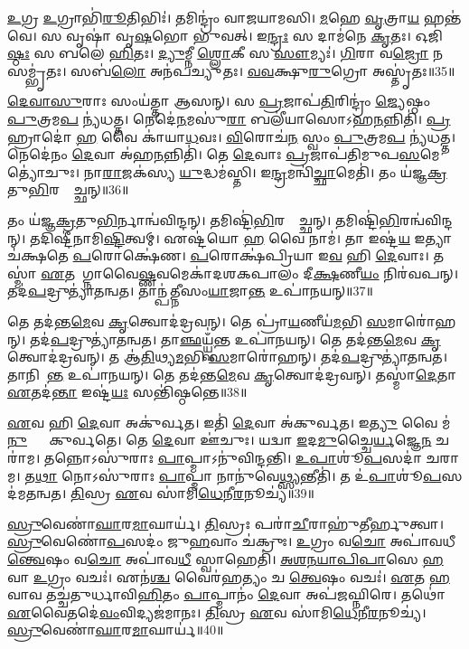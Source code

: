 \ul{𑌉}𑌗𑍍𑌰 \ul{𑌉}𑌗𑍍𑌰𑌾𑌭𑌿॑\ul{𑌰𑍂}𑌤𑌿𑌭𑌿𑌃॑।
𑌤𑌮𑌿𑌨𑍍𑌦𑍍𑌰𑌂॑ 𑌵𑌾𑌜𑌯𑌾𑌮𑌸𑌿।
\ul{𑌮}𑌹𑍇 \ul{𑌵𑍃}𑌤𑍍𑌰𑌾\ul{𑌯} 𑌹𑌨𑍍𑌤॑𑌵𑍇।
𑌸 𑌵𑍃𑌷𑌾॑ 𑌵𑍃\ul{𑌷}𑌭𑍋 𑌭𑍁॑𑌵𑌤𑍍।
𑌇\ul{𑌨𑍍𑌦𑍍𑌰𑌃} 𑌸 𑌦𑌾𑌮॑𑌨𑍇 \ul{𑌕𑍃}𑌤𑌃।
𑌓𑌜𑌿॑\ul{𑌷𑍍𑌠𑌃} 𑌸 𑌬𑌲𑍇॑ \ul{𑌹𑌿}𑌤𑌃।
\ul{𑌦𑍍𑌯𑍁}𑌮𑍍𑌨𑍀 \ul{𑌶𑍍𑌲𑍋}𑌕𑍀 𑌸 \ul{𑌸𑍗}𑌮𑍍𑌯𑌃॑।
\ul{𑌗𑌿}𑌰𑌾 𑌵\ul{𑌜𑍍𑌰𑍋} 𑌨 𑌸𑌮𑍍𑌭𑍃॑𑌤𑌃।
𑌸𑌬॑\ul{𑌲𑍋} 𑌅𑌨॑𑌪𑌚𑍍𑌯𑍁𑌤𑌃।
\ul{𑌵}\ul{𑌵}𑌕𑍍𑌷𑍁\ul{𑌰𑍁}𑌗𑍍𑌰𑍋 𑌅𑌸𑍍𑌤𑍃॑𑌤𑌃॥35॥\anuvakamend[\ul{𑌬𑍃}𑌹𑌚𑍍𑌚𑌾𑌸𑍍𑌤𑍃॑𑌤𑌃]

\ul{𑌦𑍇}\ul{𑌵𑌾}\ul{𑌸𑍁}𑌰𑌾𑌃 𑌸𑌂𑌯॑𑌤𑍍𑌤𑌾 𑌆𑌸𑌨𑍍।
𑌸 \ul{𑌪𑍍𑌰}𑌜𑌾𑌪॑\ul{𑌤𑌿}𑌰𑌿𑌨𑍍𑌦𑍍𑌰𑌂॑ \ul{𑌜𑍍𑌯𑍇}𑌷𑍍𑌠𑌂 \ul{𑌪𑍁}𑌤𑍍𑌰𑌮\ul{𑌪} 𑌨𑍍𑌯॑𑌧𑌤𑍍𑌤।
𑌨𑍇𑌦𑍇॑\ul{𑌨}𑌮𑌸𑍁॑\ul{𑌰𑌾} 𑌬𑌲𑍀॑𑌯𑌾𑌸𑍋\-𑌽𑌹\ul{𑌨}𑌨𑍍𑌨𑌿𑌤𑌿॑।
\ul{𑌪𑍍𑌰}𑌹𑍍𑌰𑌾𑌦𑍋॑ \ul{𑌹} 𑌵𑍈 𑌕𑌾॑𑌯𑌾\ul{𑌧}𑌵𑌃।
\ul{𑌵𑌿}𑌰𑍋𑌚॑\ul{𑌨}\ul{} 𑌸𑍍𑌵𑌂 \ul{𑌪𑍁}𑌤𑍍𑌰𑌮\ul{𑌪} 𑌨𑍍𑌯॑𑌧𑌤𑍍𑌤।
𑌨𑍇𑌦𑍇॑𑌨𑌂 \ul{𑌦𑍇}𑌵𑌾 𑌅॑𑌹\ul{𑌨}𑌨𑍍𑌨𑌿𑌤𑌿॑।
𑌤𑍇 \ul{𑌦𑍇}𑌵𑌾𑌃 \ul{𑌪𑍍𑌰}𑌜𑌾𑌪॑𑌤𑌿𑌮𑍁𑌪\ul{𑌸}𑌮𑍇𑌤𑍍𑌯𑍋॑𑌚𑍁𑌃।
𑌨𑌾\ul{𑌰𑌾}𑌜𑌕॑𑌸𑍍𑌯 \ul{𑌯𑍁}𑌦𑍍𑌧𑌮॑𑌸𑍍𑌤𑌿।
𑌇\ul{𑌨𑍍𑌦𑍍𑌰}𑌮𑌨𑍍𑌵𑌿॑\ul{𑌚𑍍𑌛𑌾}𑌮𑍇𑌤𑌿॑।
𑌤𑌂 𑌯॑𑌜𑍍𑌞\ul{𑌕𑍍𑌰}𑌤𑍁\ul{𑌭𑌿}𑌰𑌨𑍍𑌵𑍈᳚𑌚𑍍𑌛𑌨𑍍॥36॥

𑌤𑌂 𑌯॑𑌜𑍍𑌞\ul{𑌕𑍍𑌰}𑌤𑍁\ul{𑌭𑌿}𑌰𑍍𑌨𑌾𑌨𑍍𑌵॑𑌵𑌿𑌨𑍍𑌦𑌨𑍍।
𑌤𑌮𑌿𑌷𑍍𑌟𑌿॑\ul{𑌭𑌿}𑌰𑌨𑍍𑌵𑍈᳚𑌚𑍍𑌛𑌨𑍍।
𑌤𑌮𑌿𑌷𑍍𑌟𑌿॑\ul{𑌭𑌿}𑌰𑌨𑍍𑌵॑\-𑌵𑌿𑌨𑍍𑌦𑌨𑍍।
𑌤𑌦𑌿𑌷𑍍𑌟𑍀॑𑌨𑌾𑌮𑌿\ul{𑌷𑍍𑌟𑌿}𑌤𑍍𑌵𑌮𑍍।
𑌏𑌷𑍍𑌟॑𑌯𑍋 \ul{𑌹} 𑌵𑍈 𑌨𑌾𑌮॑।
𑌤𑌾 𑌇𑌷𑍍𑌟॑\ul{𑌯} 𑌇𑌤𑍍𑌯𑌾𑌚॑𑌕𑍍𑌷𑌤𑍇 \ul{𑌪}𑌰𑍋𑌕𑍍𑌷𑍇॑𑌣।
\ul{𑌪}𑌰𑍋𑌕𑍍𑌷॑𑌪𑍍𑌰𑌿𑌯𑌾 𑌇\ul{𑌵} 𑌹𑌿 \ul{𑌦𑍇}𑌵𑌾𑌃।
𑌤𑌸𑍍𑌮𑌾॑ \ul{𑌏}𑌤𑌮𑌾᳚𑌗𑍍𑌨𑌾𑌵𑍈\ul{𑌷𑍍𑌣}𑌵𑌮𑍇𑌕𑌾॑𑌦𑌶𑌕𑌪𑌾𑌲𑌂 𑌦𑍀\ul{𑌕𑍍𑌷}𑌣𑍀\ul{𑌯𑌂} 𑌨𑌿𑌰॑𑌵𑌪𑌨𑍍।
𑌤𑌦॑\ul{𑌪}𑌦𑍍𑌰𑍁𑌤𑍍𑌯𑌾॑𑌤𑌨𑍍𑌵𑌤।
𑌤𑌾𑌨𑍍𑌪॑𑌤𑍍𑌨𑍀𑌸𑌂\ul{𑌯𑌾}𑌜𑌾\ul{𑌨𑍍𑌤} 𑌉𑌪𑌾॑𑌨𑌯𑌨𑍍॥37॥

𑌤𑍇 𑌤𑌦॑𑌨𑍍𑌤\ul{𑌮𑍇}𑌵 \ul{𑌕𑍃}𑌤𑍍𑌵𑍋𑌦॑𑌦𑍍𑌰𑌵𑌨𑍍।
𑌤𑍇 𑌪𑍍𑌰𑌾॑\ul{𑌯}𑌣𑍀𑌯॑\ul{𑌮}𑌭𑌿 \ul{𑌸}𑌮𑌾𑌰𑍋॑𑌹𑌨𑍍।
𑌤𑌦॑\ul{𑌪}𑌦𑍍𑌰𑍁𑌤𑍍𑌯𑌾॑\-𑌤𑌨𑍍𑌵𑌤।
𑌤𑌾\ul{𑌞𑍍𑌛}𑌯𑍍𑌯𑍍𑌵𑌁॑\ul{𑌨𑍍𑌤} 𑌉𑌪𑌾॑𑌨𑌯𑌨𑍍।
𑌤𑍇 𑌤𑌦॑𑌨𑍍𑌤\ul{𑌮𑍇}𑌵 \ul{𑌕𑍃}𑌤𑍍𑌵𑍋𑌦॑𑌦𑍍𑌰𑌵𑌨𑍍।
𑌤 𑌆॑\ul{𑌤𑌿}𑌥𑍍𑌯\ul{𑌮}𑌭𑌿 \ul{𑌸}𑌮𑌾𑌰𑍋॑𑌹𑌨𑍍।
𑌤𑌦॑\ul{𑌪}𑌦𑍍𑌰𑍁𑌤𑍍𑌯𑌾॑\-𑌤𑌨𑍍𑌵𑌤।
𑌤𑌾𑌨𑌿𑌡𑌾᳚\ul{𑌨𑍍𑌤} 𑌉𑌪𑌾॑𑌨𑌯𑌨𑍍।
𑌤𑍇 𑌤𑌦॑𑌨𑍍𑌤\ul{𑌮𑍇}𑌵 \ul{𑌕𑍃}𑌤𑍍𑌵𑍋𑌦॑𑌦𑍍𑌰𑌵𑌨𑍍।
𑌤𑌸𑍍𑌮𑌾॑\ul{𑌦𑍇}𑌤𑌾 \ul{𑌏}𑌤𑌦॑\ul{𑌨𑍍𑌤𑌾} 𑌇𑌷𑍍𑌟॑\ul{𑌯𑌃} 𑌸𑌨𑍍𑌤𑌿॑𑌷𑍍𑌠𑌨𑍍𑌤𑍇॥38॥

\ul{𑌏}𑌵 𑌹𑌿 \ul{𑌦𑍇}𑌵𑌾 𑌅𑌕𑍁॑𑌰𑍍𑌵𑌤।
𑌇𑌤𑌿॑ \ul{𑌦𑍇}𑌵𑌾 𑌅॑𑌕𑍁𑌰𑍍𑌵𑌤।
𑌇\ul{𑌤𑍍𑌯𑍁} 𑌵𑍈 𑌮॑\ul{𑌨𑍁}𑌷𑍍𑌯𑌾𑌃᳚ 𑌕𑍁𑌰𑍍𑌵𑌤𑍇।
𑌤𑍇 \ul{𑌦𑍇}𑌵𑌾 𑌊॑𑌚𑍁𑌃।
𑌯𑌦𑍍𑌵𑌾 \ul{𑌇}𑌦\ul{𑌮𑍁}𑌚𑍍𑌚𑍈\ul{𑌰𑍍𑌯}𑌜𑍍𑌞𑍇\ul{𑌨} 𑌚𑌰𑌾॑𑌮।
𑌤𑌨𑍍𑌨𑍋\-𑌽𑌸𑍁॑𑌰𑌾𑌃 \ul{𑌪𑌾}𑌪𑍍𑌮𑌾\-𑌽𑌨𑍁॑𑌵𑌿𑌨𑍍𑌦𑌨𑍍𑌤𑌿।
\ul{𑌉}\ul{𑌪𑌾}\ul{}𑌶𑍂॑\ul{𑌪}𑌸𑌦𑌾॑ 𑌚𑌰𑌾𑌮।
𑌤\ul{𑌥𑌾} 𑌨𑍋𑌽𑌸𑍁॑𑌰𑌾𑌃 \ul{𑌪𑌾}𑌪𑍍𑌮𑌾 𑌨𑌾𑌨𑍁॑𑌵𑍇\ul{𑌥𑍍𑌸𑍍𑌯}𑌨𑍍𑌤𑍀𑌤𑌿॑।
𑌤 𑌉॑\ul{𑌪𑌾}\ul{}𑌶𑍂॑\ul{𑌪}𑌸𑌦॑𑌮𑌤𑌨𑍍𑌵𑌤।
\ul{𑌤𑌿}𑌸𑍍𑌰 \ul{𑌏}𑌵 𑌸𑌾॑𑌮𑌿\ul{𑌧𑍇}𑌨𑍀\ul{𑌰}𑌨𑍂𑌚𑍍𑌯॑॥39॥

\ul{𑌸𑍍𑌰𑍁}𑌵𑍇𑌣𑌾॑\ul{𑌘𑌾}𑌰\ul{𑌮𑌾}𑌘𑌾𑌰𑍍𑌯॑।
\ul{𑌤𑌿}𑌸𑍍𑌰𑌃 𑌪𑌰𑌾॑\ul{𑌚𑍀}𑌰𑌾𑌹𑍁॑𑌤𑍀𑌰𑍍\mbox{}\ul{𑌹𑍁}𑌤𑍍𑌵𑌾।
\ul{𑌸𑍍𑌰𑍁}𑌵𑍇𑌣𑍋॑\ul{𑌪}𑌸𑌦𑌂॑ 𑌜𑍁\ul{𑌹}𑌵𑌾𑌂 𑌚॑𑌕𑍍𑌰𑍁𑌃।
\ul{𑌉}𑌗𑍍𑌰𑌂 𑌵\ul{𑌚𑍋} 𑌅𑌪𑌾॑𑌵𑌧𑍀\ul{𑌨𑍍𑌤𑍍𑌵𑍇}𑌷𑌂 𑌵\ul{𑌚𑍋} 𑌅𑌪𑌾॑𑌵\ul{𑌧𑍀}\ul{} 𑌸𑍍𑌵𑌾𑌹𑍇𑌤𑌿॑।
\ul{𑌅}\ul{𑌶}\ul{𑌨}\ul{𑌯𑌾}\ul{𑌪𑌿}\ul{𑌪𑌾}𑌸𑍇 \ul{𑌹} 𑌵𑌾 \ul{𑌉}𑌗𑍍𑌰𑌂 𑌵𑌚𑌃॑।
𑌏𑌨॑\ul{𑌶𑍍𑌚} 𑌵𑍈𑌰॑𑌹𑌤𑍍𑌯𑌂 𑌚 \ul{𑌤𑍍𑌵𑍇}𑌷𑌂 𑌵𑌚𑌃॑।
\ul{𑌏}𑌤 \ul{𑌹} 𑌵𑌾𑌵 𑌤𑌚𑍍𑌚॑𑌤𑍁𑌰𑍍𑌧𑌾𑌵𑌿\ul{𑌹𑌿}𑌤𑌂 \ul{𑌪𑌾}𑌪𑍍𑌮𑌾𑌨𑌂॑ \ul{𑌦𑍇}𑌵𑌾 𑌅𑌪॑𑌜𑌘𑍍𑌨𑌿𑌰𑍇।
𑌤𑌥𑍋॑ \ul{𑌏}𑌵𑍈𑌤𑌦𑍇॑\ul{𑌵𑌂}𑌵𑌿𑌦𑍍𑌯𑌜॑𑌮𑌾𑌨𑌃।
\ul{𑌤𑌿}𑌸𑍍𑌰 \ul{𑌏}𑌵 𑌸𑌾॑𑌮𑌿\ul{𑌧𑍇}𑌨𑍀\ul{𑌰}𑌨𑍂𑌚𑍍𑌯॑।
\ul{𑌸𑍍𑌰𑍁}𑌵𑍇𑌣𑌾॑\ul{𑌘𑌾}𑌰\ul{𑌮𑌾}𑌘𑌾𑌰𑍍𑌯॑॥40॥

